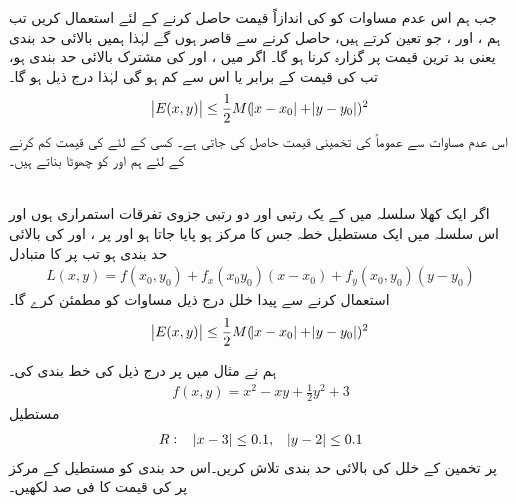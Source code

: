 جب ہم اس عدم مساوات کو   کی اندازاً قیمت حاصل کرنے کے لئے استعمال کریں تب ہم ،  اور ، جو  تعین کرتے ہیں،  حاصل کرنے سے قاصر ہوں گے لہٰذا ہمیں  بالائی حد بندی  یعنی  بد ترین قیمت  پر گزارہ کرنا ہو گا۔   اگر    میں  ،  اور     کی مشترک بالائی حد بندی  ہو، تب  کی قیمت  کے برابر یا اس سے کم ہو گی لہٰذا درج ذیل ہو گا۔
\begin{align*}
\abs{E(x,y)}\le\frac{1}{2}M(\abs{x-x_0}+\abs{y-y_0})^2
\end{align*}
اس  عدم مساوات سے عموماً   کی  تخمینی  قیمت حاصل کی جاتی ہے۔  کسی  کے لئے  کی قیمت کم کرنے کے لئے ہم  اور  کو چھوٹا بناتے ہیں۔

\\
اگر   ایک  کھلا  سلسلہ  میں  کے یک رتبی اور دو رتبی جزوی تفرقات استمراری ہوں اور اس سلسلہ   میں ایک  مستطیل خطہ    جس کا مرکز  ہو پایا جاتا ہو  اور  پر ،  اور   کی بالائی حد  بندی  ہو   تب    پر  کا متبادل 
\begin{align*}
L(x,y)=f(x_0,y_0)+f_x(x_0y_0)(x-x_0)+f_y(x_0,y_0)(y-y_0)
\end{align*}
استعمال کرنے سے پیدا خلل  درج ذیل مساوات کو مطمئن کرے گا۔
\begin{align}\label{مساوات_کثیرالمتغیر_بالائی_حد_بندی_عدم_مساوات}
\abs{E(x,y)}\le \frac{1}{2}M(\abs{x-x_0}+\abs{y-y_0})^2
\end{align}


ہم نے مثال  میں  پر درج ذیل کی خط بندی کی۔
\begin{align*}
f(x,y)=x^2-xy+\frac{1}{2}y^2+3
\end{align*}
مستطیل 
\begin{align*}
R:\quad \abs{x-3}\le 0.1,\quad \abs{y-2}\le 0.1
\end{align*}
پر تخمین  کے خلل کی بالائی حد بندی  تلاش کریں۔اس حد بندی کو  مستطیل کے مرکز پر   کی قیمت  کا فی صد لکھیں۔

